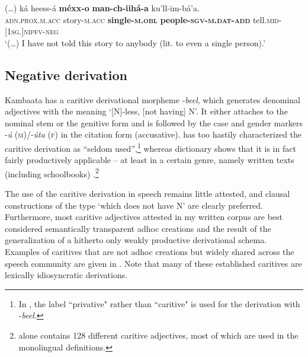 \documentclass[output=paper,colorlinks,citecolor=brown,draftmode
]{langscibook}
\begin{document}
\ea\label{ex:treis:40} 
\gll (…) 	ká						heess-á			\textbf{méxx-o}			\textbf{man-ch-iihá-a}	ku’ll-im-bá’a. \\
{}		\textsc{\textsc{adn}.prox.m.acc} story-\textsc{m.acc}	\textbf{single-\textsc{m.obl}}	\textbf{people-\textsc{sgv-m.dat-add}} tell.\textsc{mid-[1sg.]nipfv-neg}\\
\glt ‘(…) I have not told this story to anybody (lit. to even a single person).’ \citep[91]{Saint-Exupéry2018}
\z 

\subsection{Negative derivation}\label{sec:treis:3.3}

Kambaata has a caritive derivational morpheme -\textit{beel}, which generates denominal adjectives with the meaning ‘[N]-less, [not having] N’. It either attaches to the nominal stem or the genitive form and is followed by the case and gender markers -\textit{ú} (\textsc{m})/-\textit{úta} (\textsc{f}) in the citation form (accusative). \citet[277]{Treis2008} has too hastily characterized the caritive derivation as “seldom used”,\footnote{In \citet{Treis2008}, the label “privative" rather than “caritive" is used for the derivation with -\textit{beel}.} whereas  dictionary shows that it is in fact fairly productively applicable – at least in a certain genre, namely written texts (including schoolbooks) .\footnote{\citet{Alemu2016} alone contains 128 different caritive adjectives, most of which are used in the monolingual definitions.}


The use of the caritive derivation in speech remains little attested, and clausal constructions of the type ‘which does not have N’ are clearly preferred. Furthermore, most caritive adjectives attested in my written corpus are best considered semantically transparent adhoc creations and the result of the generalization of a hitherto only weakly productive derivational schema. Examples of caritives that are not adhoc creations but widely shared across the speech community are given in . Note that many of these established caritives are lexically idiosyncratic derivations.
\end{document}
